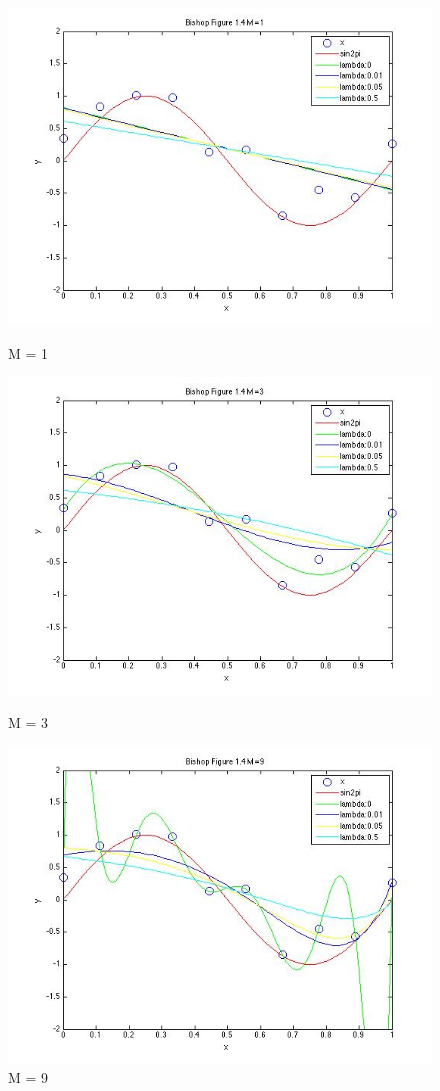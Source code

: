 \begin{figure}[!htb]
  \includegraphics[width=\linewidth]{figures/p3_bishop_m=1}
  \caption{M = 1}\label{fig:figures/p3_bishop_m=1}
\endminipage\hfill
{}
  \includegraphics[width=\linewidth]{figures/p3_bishop_m=3}
  \caption{M = 3}\label{fig:figures/p3_bishop_m=3}
\endminipage\hfill
{}%
  \includegraphics[width=\linewidth]{figures/p3_bishop_m=9}
  \caption{M = 9}\label{fig:figures/p3_bishop_m=9}
\endminipage\hfill


\end{figure}
